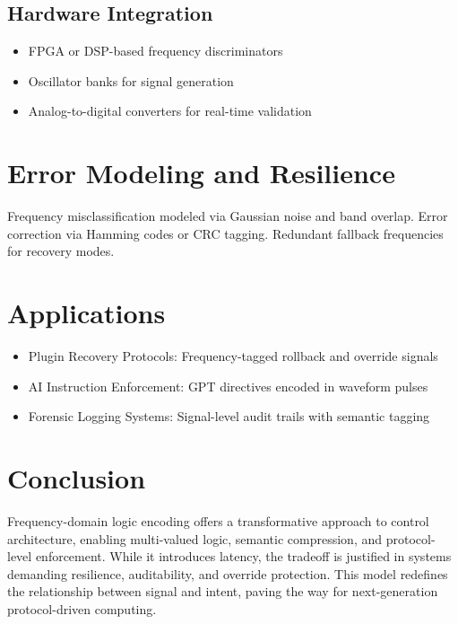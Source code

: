 \documentclass[12pt]{article}
\begin{document}
\subsection{Hardware Integration}
\begin{itemize}
  \item FPGA or DSP-based frequency discriminators
  \item Oscillator banks for signal generation
  \item Analog-to-digital converters for real-time validation
\end{itemize}

\section{Error Modeling and Resilience}
Frequency misclassification modeled via Gaussian noise and band overlap. Error correction via Hamming codes or CRC tagging. Redundant fallback frequencies for recovery modes.

\section{Applications}
\begin{itemize}
  \item Plugin Recovery Protocols: Frequency-tagged rollback and override signals
  \item AI Instruction Enforcement: GPT directives encoded in waveform pulses
  \item Forensic Logging Systems: Signal-level audit trails with semantic tagging
\end{itemize}

\section{Conclusion}
Frequency-domain logic encoding offers a transformative approach to control architecture, enabling multi-valued logic, semantic compression, and protocol-level enforcement. While it introduces latency, the tradeoff is justified in systems demanding resilience, auditability, and override protection. This model redefines the relationship between signal and intent, paving the way for next-generation protocol-driven computing.



\end{document}
